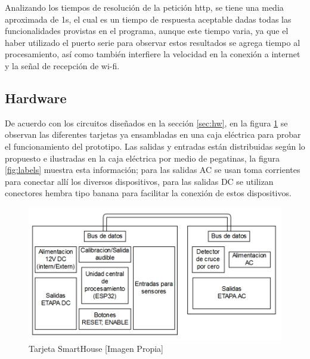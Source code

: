 Analizando los tiempos de resolución de la petición http, se tiene una media aproximada de 1s, el cual es un tiempo de respuesta aceptable dadas todas las funcionalidades provistas en el programa, aunque este tiempo varia, ya que el haber utilizado el puerto serie para observar estos resultados se agrega tiempo al procesamiento, así como también interfiere la velocidad en la conexión a internet y la señal de recepción de wi-fi.\\


\subsection{Hardware}

De acuerdo con los circuitos diseñados en la sección \ref{sec:hw}, en la figura \ref{fig:tarjeta} se observan las diferentes tarjetas ya ensambladas en una caja eléctrica para probar el funcionamiento del prototipo. Las salidas y entradas están distribuidas según lo propuesto e ilustradas en la caja eléctrica por medio de pegatinas, la figura \ref{fig:labels} muestra esta información; para las salidas AC se usan toma corrientes para conectar allí los diversos dispositivos, para las salidas DC se utilizan conectores hembra tipo banana para facilitar la conexión de estos dispositivos.\\

\begin{figure}[!t]
	\centering
	\caption{Tarjeta SmartHouse [Imagen Propia]}
	\label{fig:tarjeta}
	\includegraphics[width=0.6\linewidth]{Imagenes/Tarjeta}
\end{figure}

